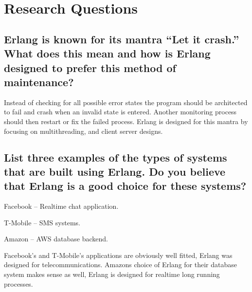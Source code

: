 \documentclass[12pt]{article}
\begin{document}
\section{Research Questions}

\subsection{Erlang is known for its mantra ``Let it crash.''
  What does this mean and how is Erlang designed to prefer
  this method of maintenance?}

  Instead of checking for all possible error states the program should be
  architected to fail and crash when an invalid state is entered. Another
  monitoring process should then restart or fix the failed process.
  Erlang is designed for this mantra by focusing on multithreading, and
  client server designs.

\subsection{List three examples of the types of systems that are built using
  Erlang. Do you believe that Erlang is a good choice for these systems?}

  \begin{definition}
  \item[Facebook] -- Realtime chat application.
  \item[T-Mobile] -- SMS systems.
  \item[Amazon] -- AWS database backend.
\end{definition}

Facebook's and T-Mobile's applications are obviously well fitted, Erlang
was designed for telecommunications. Amazons choice of Erlang for their
database system makes sense as well, Erlang is designed for realtime
long running processes.
\end{document}
